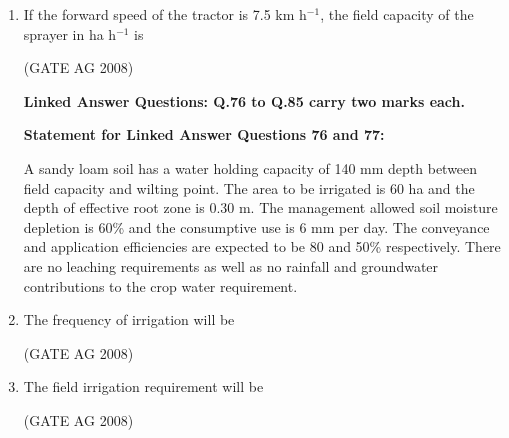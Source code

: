 \documentclass[journal]{IEEEtran}
\begin{document}
\begin{enumerate}
\medskip

\item 
 If the forward speed of the tractor is 7.5 km h$^{-1}$, the field capacity of the sprayer in ha h$^{-1}$ is
\begin{enumerate}
\end{enumerate}
\hfill(GATE AG 2008)\\

\medskip


\textbf{Linked Answer Questions: Q.76 to Q.85 carry two marks each.}

\textbf{Statement for Linked Answer Questions 76 and 77:}

A sandy loam soil has a water holding capacity of 140 mm depth between field capacity and wilting point. The area to be irrigated is 60 ha and the depth of effective root zone is 0.30 m. The management allowed soil moisture depletion is 60\% and the consumptive use is 6 mm per day. The conveyance and application efficiencies are expected to be 80 and 50\% respectively. There are no leaching requirements as well as no rainfall and groundwater contributions to the crop water requirement.

\item 
 The frequency of irrigation will be
\begin{enumerate}
\end{enumerate}
\hfill(GATE AG 2008)\\

\medskip

\item 
 The field irrigation requirement will be
\begin{enumerate}
\end{enumerate}
\hfill(GATE AG 2008)\\


\end{enumerate}
\end{document}
